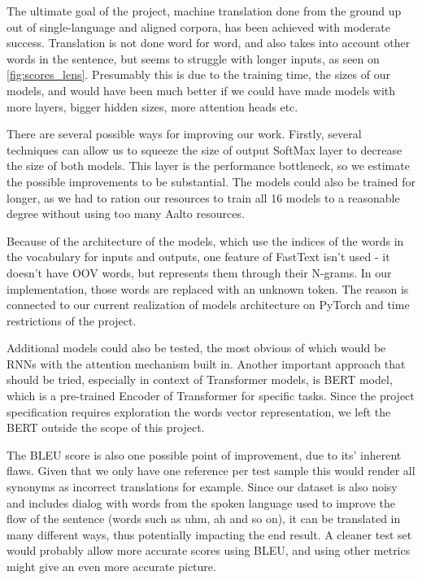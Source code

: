 \documentclass{article}
\begin{document}
The ultimate goal of the project, machine translation done from the ground up out of single-language and aligned corpora, has been achieved with moderate success. Translation is not done word for word, and also takes into account other words in the sentence, but seems to struggle with longer inputs, as seen on \ref{fig:scores_lens}. Presumably this is due to the training time, the sizes of our models, and would have been much better if we could have made models with more layers, bigger hidden sizes, more attention heads etc. 

There are several possible ways for improving our work. Firstly, several techniques can allow us to squeeze the size of output SoftMax layer to decrease the size of both models. This layer is the performance bottleneck, so we estimate the possible improvements to be substantial. The models could also be trained for longer, as we had to ration our resources to train all 16 models to a reasonable degree without using too many Aalto resources.

Because of the architecture of the models, which use the indices of the words in the vocabulary for inputs and outputs, one feature of FastText isn't used - it doesn't have OOV words, but represents them through their N-grams. In our implementation, those words are replaced with an unknown token. The reason is connected to our current realization of models architecture on PyTorch and time restrictions of the project.

Additional models could also be tested, the most obvious of which would be RNNs with the attention mechanism built in. Another important approach that should be tried, especially in context of Transformer models, is BERT model, which is a pre-trained Encoder of Transformer for specific tasks. Since the project specification requires exploration the words vector representation, we left the BERT outside the scope of this project.

The BLEU score is also one possible point of improvement, due to its' inherent flaws. Given that we only have one reference per test sample this would render all synonyms as incorrect translations for example. Since our dataset is also noisy and includes dialog with words from the spoken language used to improve the flow of the sentence (words such as uhm, ah and so on), it can be translated in many different ways, thus potentially impacting the end result. A cleaner test set would probably allow more accurate scores using BLEU, and using other metrics might give an even more accurate picture.
\end{document}
